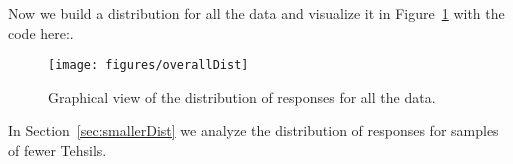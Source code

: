 \documentclass{article}\usepackage{knitr}
\begin{document}
Now we build a distribution for all the data and visualize it in Figure~\ref{fig:overallDist} with the code here:.
\begin{knitrout}
\color{fgcolor}\begin{figure}[!hbtp]


{\centering \texttt{[image: figures/overallDist]} 

}

\caption[Graphical view of the distribution of responses for all the data]{Graphical view of the distribution of responses for all the data.\label{fig:overallDist}}
\end{figure}


\end{knitrout}



In Section~\ref{sec:smallerDist} we analyze the distribution of responses for samples of fewer Tehsils.


\cleardoublepage
{}
\listoffigures
\printindex
\end{document}
